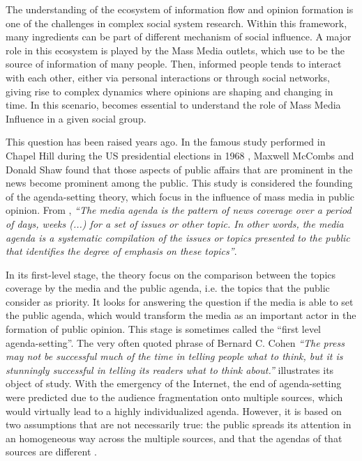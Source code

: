 \documentclass{bmcart}
\begin{document}
\par The understanding of  the ecosystem of information flow and opinion formation is one of the challenges in  complex social system research. Within this framework, many ingredients can be part of different mechanism of social influence. A major role in this ecosystem is played by the Mass Media outlets, which use to be the source of information of many people.  Then, informed people tends to interact with each other, either via personal interactions or through social networks, giving rise to complex dynamics where opinions are shaping and changing in time. In this scenario, becomes essential to understand the role of Mass Media Influence in a given social group.
\par  This question has been raised years ago. In the famous study performed in Chapel Hill during the US presidential elections in 1968 \cite{mccombs1972agenda}, Maxwell McCombs and Donald Shaw found that those aspects of public affairs that are prominent in the news become prominent among the public.
This study is considered the founding of the agenda-setting theory, which focus in the influence of mass media in public opinion.  
From \cite{mccombs2014agenda}, \textit{``The media agenda is the pattern of news coverage over a period of days, weeks (...) for a set of issues or other topic. In other words, the media agenda is a systematic compilation of the issues or topics presented to the public that identifies the degree of emphasis on these topics''}. 
\par In its first-level stage, the theory focus on the comparison between the topics coverage by the media and the public agenda, i.e. the topics that the public consider as priority.
It looks for answering the question if the media is able to set the public agenda, which would transform the media as an important actor in the formation of public opinion. 
This stage is sometimes called the ``first level agenda-setting''.  The very often quoted phrase of Bernard C. Cohen \textit{``The press may not be successful much of the time in telling people what to think, but it is stunningly successful in telling its readers what to think about.''} illustrates its object of study. With the emergency of the Internet, the end of agenda-setting were predicted due to the audience fragmentation onto multiple sources, which would virtually lead to a highly individualized agenda. However, it is based on two assumptions that are not necessarily true: the public spreads its attention in an homogeneous way across the multiple sources, and that the agendas of that sources are different \cite{mccombs2005look}.
\end{document}
